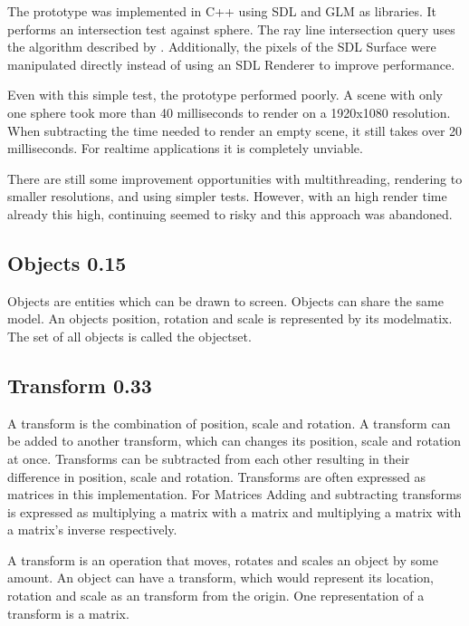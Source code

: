 The prototype was implemented in C++ using SDL \cite{sdl} and GLM \cite{glm} as libraries. It performs an intersection test against sphere. The ray line intersection query uses the algorithm described by \textcite{eberly:2006:3d}. Additionally, the pixels of the SDL Surface were manipulated directly instead of using an SDL Renderer to improve performance.

Even with this simple test, the prototype performed poorly. A scene with only one sphere took more than 40 milliseconds to render on a 1920x1080 resolution. When subtracting the time needed to render an empty scene, it still takes over 20 milliseconds. For realtime applications it is completely unviable.

There are still some improvement opportunities with multithreading, rendering to smaller resolutions, and using simpler tests. However, with an high render time already this high, continuing seemed to risky and this approach was abandoned.






\subsection{Objects 0.15}
Objects are entities which can be drawn to screen. Objects can share the same model. An objects position, rotation and scale is represented by its \gls{modelmatix}. The set of all objects is called the \gls{objectset}.

\subsection{Transform 0.33}
A transform is the combination of position, scale and rotation. A transform can be added to another transform, which can changes its position, scale and rotation at once. Transforms can be subtracted from each other resulting in their difference in position, scale and rotation. Transforms are often expressed as matrices in this implementation. For Matrices Adding and subtracting transforms is expressed as multiplying a matrix with a matrix and multiplying a matrix with a matrix's inverse respectively.


A transform is an operation that moves, rotates and scales an object by some amount. An object can have a transform, which would represent its location, rotation and scale as an transform from the origin. One representation of a transform is a matrix.

